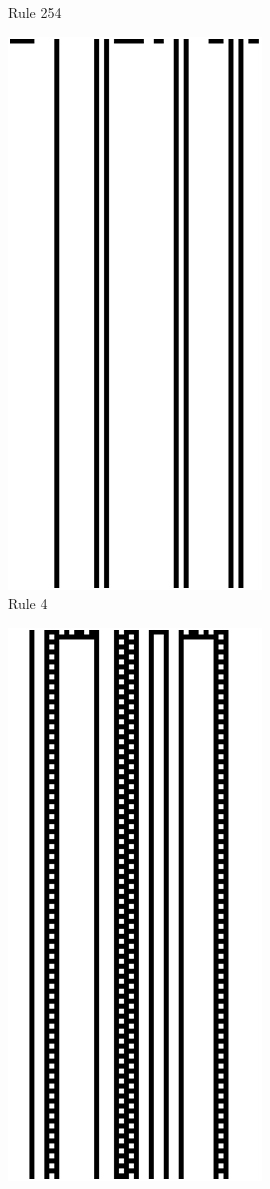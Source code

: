 \begin{figure}
\begin{subfigure}[b]{0.25\textwidth}
		\caption[]{Rule 254}%
   \end{subfigure}%
       \begin{subfigure}[b]{0.25\textwidth}
   	\centering
   	\includegraphics[scale=0.32]{./images/CA_FDM/rule4}
   	\caption[]{Rule 4}%
   \end{subfigure}%
   \begin{subfigure}[b]{0.25\textwidth}
   	\centering
   	\includegraphics[scale=0.32]{./images/CA_FDM/rule108}

\end{subfigure}
\end{figure}
